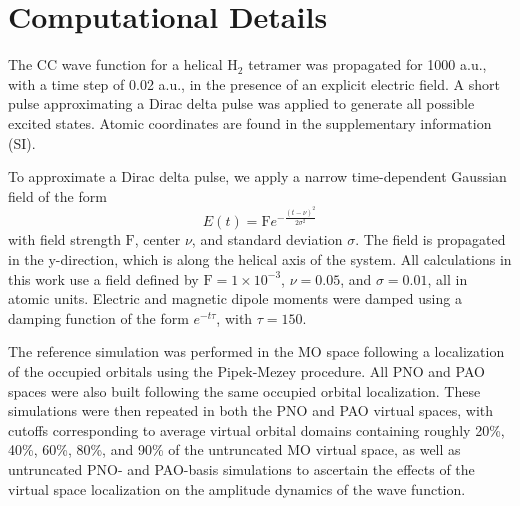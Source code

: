 \section{Computational Details} \label{se:comp}
The CC wave function for a helical H$_2$ tetramer was propagated
for 1000 a.u., with a time step of 0.02 a.u., in the presence of an explicit electric field. A short pulse
approximating a Dirac delta pulse was applied to generate all possible excited states. Atomic coordinates
are found in the supplementary information (SI).

To approximate a Dirac delta pulse, we apply a narrow time-dependent Gaussian field 
of the form
\begin{equation}
    E(t) = \textrm{F}e^{-\frac{(t-\nu)^{2}}{2\sigma^2}}
\end{equation}
with field strength $\textrm{F}$, center $\nu$, and standard deviation $\sigma$.
The field is propagated in the y-direction, which is along the helical axis of the system.
All calculations in this work use a field defined by $\textrm{F} = 1\times 10^{-3}$,
$\nu = 0.05$, and $\sigma = 0.01$, all in atomic units. Electric and magnetic 
dipole moments were damped using a damping function of the form $e^{-t\tau}$, 
with $\tau = 150$.

The reference simulation was performed in the MO space following a localization of the occupied
orbitals using the Pipek-Mezey procedure.\cite{Pipek1989} All PNO and PAO spaces were also 
built following the same occupied orbital localization. These simulations
were then repeated in both the PNO and PAO virtual spaces, with cutoffs
corresponding to average virtual orbital domains containing roughly 20\%, 40\%, 60\%,
80\%, and 90\% of the untruncated MO virtual space, as well as untruncated PNO- and PAO-basis
simulations to ascertain the effects of the virtual space localization on
the amplitude dynamics of the wave function. 

